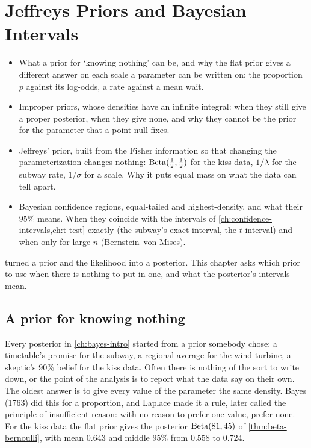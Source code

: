 \chapter{Jeffreys Priors and Bayesian Intervals}
\label{ch:jeffreys}

\begin{chaptergoals}
\begin{itemize}[nosep]
\item What a prior for `knowing nothing' can be, and why the flat prior gives a different answer on each scale a parameter can be written on: the proportion $p$ against its log-odds, a rate against a mean wait.
\item Improper priors, whose densities have an infinite integral: when they still give a proper posterior, when they give none, and why they cannot be the prior for the parameter that a point null fixes.
\item Jeffreys' prior, built from the Fisher information so that changing the parameterization changes nothing: $\mathrm{Beta}(\frac12, \frac12)$ for the kiss data, $1/\lambda$ for the subway rate, $1/\sigma$ for a scale. Why it puts equal mass on what the data can tell apart.
\item Bayesian confidence regions, equal-tailed and highest-density, and what their $95\%$ means. When they coincide with the intervals of \cref{ch:confidence-intervals,ch:t-test} exactly (the subway's exact interval, the $t$-interval) and when only for large $n$ (Bernstein--von Mises).
\end{itemize}
 turned a prior and the likelihood into a posterior. This chapter asks which prior to use when there is nothing to put in one, and what the posterior's intervals mean.
\end{chaptergoals}

\section{A prior for knowing nothing}
\label{sec:jeff-flat}

Every posterior in \cref{ch:bayes-intro} started from a prior somebody chose: a timetable's promise for the subway, a regional average for the wind turbine, a skeptic's $90\%$ belief for the kiss data.
Often there is nothing of the sort to write down, or the point of the analysis is to report what the data say on their own.
The oldest answer is to give every value of the parameter the same density.
Bayes (1763) did this for a proportion, and Laplace made it a rule, later called the principle of insufficient reason: with no reason to prefer one value, prefer none.
For the kiss data the flat prior gives the posterior $\mathrm{Beta}(81, 45)$ of \cref{thm:beta-bernoulli}, with mean $0.643$ and middle $95\%$ from $0.558$ to $0.724$.

